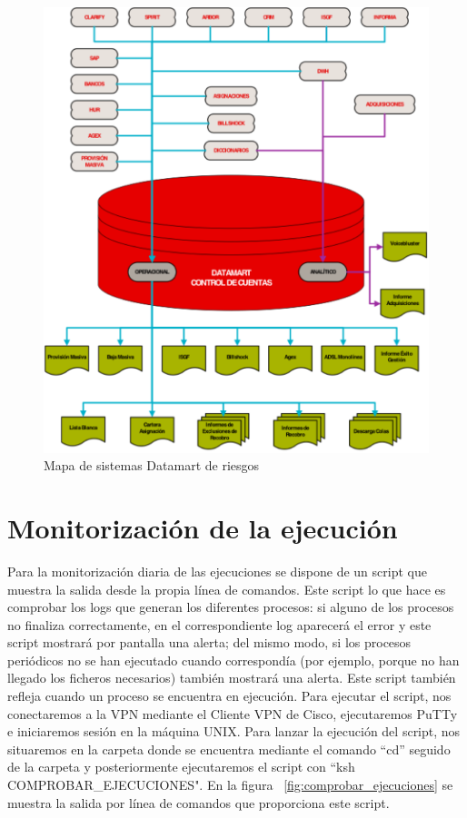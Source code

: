 \documentclass[a4paper, 12pt]{book}
\begin{document}
\begin{figure}
  \centering
  \includegraphics[width=12cm, keepaspectratio]{img/mapa_sistemas}
  \caption{Mapa de sistemas Datamart de riesgos}
  \label{fig:mapa_sistemas}
\end{figure}

\section{Monitorización de la ejecución} 
\label{sec:monitorizacion}
Para la monitorización diaria de las ejecuciones se dispone de un script que muestra la salida desde la propia línea de comandos. Este script lo que hace es comprobar los logs que generan los diferentes procesos: si alguno de los procesos no finaliza correctamente, en el correspondiente log aparecerá el error y este script mostrará por pantalla una alerta; del mismo modo, si los procesos periódicos no se han ejecutado cuando correspondía (por ejemplo, porque no han llegado los ficheros necesarios) también mostrará una alerta. Este script también refleja cuando un proceso se encuentra en ejecución.
Para ejecutar el script, nos conectaremos a la VPN mediante el Cliente VPN de Cisco, ejecutaremos PuTTy e iniciaremos sesión en la máquina UNIX. Para lanzar la ejecución del script, nos situaremos en la carpeta donde se encuentra mediante el comando “cd” seguido de la carpeta y posteriormente ejecutaremos el script con ``ksh COMPROBAR\_EJECUCIONES". En la figura ~\ref{fig:comprobar_ejecuciones} se muestra la salida por línea de comandos que proporciona este script.
\end{document}
